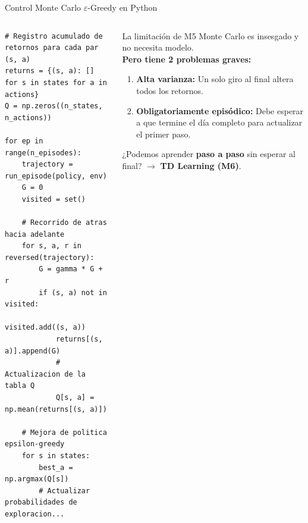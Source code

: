 \begin{frame}[fragile]{Control Monte Carlo $\varepsilon$-Greedy en Python}
  \begin{columns}[T,onlytextwidth]
\begin{lstlisting}[style=rlcode]
# Registro acumulado de retornos para cada par (s, a)
returns = {(s, a): [] for s in states for a in actions}
Q = np.zeros((n_states, n_actions))

for ep in range(n_episodes):
    trajectory = run_episode(policy, env)
    G = 0
    visited = set()
    
    # Recorrido de atras hacia adelante
    for s, a, r in reversed(trajectory):
        G = gamma * G + r
        if (s, a) not in visited:
            visited.add((s, a))
            returns[(s, a)].append(G)
            # Actualizacion de la tabla Q
            Q[s, a] = np.mean(returns[(s, a)])
            
    # Mejora de politica epsilon-greedy
    for s in states:
        best_a = np.argmax(Q[s])
        # Actualizar probabilidades de exploracion...
\end{lstlisting}
      \begin{alertblock}{La limitación de M5}
        Monte Carlo es insesgado y no necesita modelo.\\
        \vspace{0.2cm}
        \textbf{Pero tiene 2 problemas graves:}
        \begin{enumerate}
          \item \textbf{Alta varianza:} Un solo giro al final altera todos los retornos.
          \item \textbf{Obligatoriamente episódico:} Debe esperar a que termine el día completo para actualizar el primer paso.
        \end{enumerate}
        \vspace{0.2cm}
        ¿Podemos aprender \textbf{paso a paso} sin esperar al final? $\to$ \textbf{TD Learning (M6)}.
      \end{alertblock}
  \end{columns}
\end{frame}
